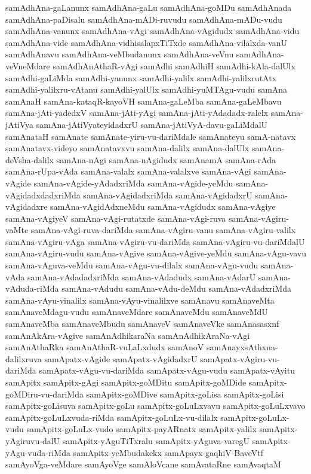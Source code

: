 {samAdhAna-gaLanunx
samAdhAna-gaLu
samAdhAna-goMDu
samAdhAnada
samAdhAna-paDisalu
samAdhAna-mADi-ruvudu
samAdhAna-mADu-vudu
samAdhAna-vanunx
samAdhAna-vAgi
samAdhAna-vAgidudx
samAdhAna-vidu
samAdhAna-vide
samAdhAna-vidhisalapxTiTxde
samAdhAna-vilalxda-vanU
samAdhAnavu
samAdhAna-veMbudanunx
samAdhAna-veVnu
samAdhAna-veVneMdare
samAdhAnAthaR-vAgi
samAdhi
samAdhiH
samAdhi-kAla-dalUlx
samAdhi-gaLiMda
samAdhi-yanunx
samAdhi-yalilx
samAdhi-yalilxrutAtx
samAdhi-yalilxru-vAtanu
samAdhi-yalUlx
samAdhi-yuMTAgu-vudu
samAna
samAnaH
samAna-kataqR-kayoVH
samAna-gaLeMba
samAna-gaLeMbavu
samAna-jAti-yadedxV
samAna-jAti-yAgi
samAna-jAti-yAdadadx-ralelx
samAna-jAtiVya
samAna-jAtiVyateyidadxrU
samAna-jAtiVyA-davu-gaLiMdalU
samAnataH
samAnate
samAnate-yiru-vu-dariMdale
samAnateyu
samA-natavx
samAnatavx-videyo
samAnatavxvu
samAna-dalilx
samAna-dalUlx
samAna-deVsha-dalilx
samAna-nAgi
samAna-nAgidudx
samAnamA
samAna-rAda
samAna-rUpa-vAda
samAna-valalx
samAna-valalxve
samAna-vAgi
samAna-vAgide
samAna-vAgide-yAdadxriMda
samAna-vAgide-yeMdu
samAna-vAgidadxdadxriMda
samAna-vAgidadxriMda
samAna-vAgidadxrU
samAna-vAgidadxre
samAna-vAgidAdxneMdu
samAna-vAgidudx
samAna-vAgiye
samAna-vAgiyeV
samAna-vAgi-rutatxde
samAna-vAgi-ruva
samAna-vAgiru-vaMte
samAna-vAgi-ruva-dariMda
samAna-vAgiru-vanu
samAna-vAgiru-valilx
samAna-vAgiru-vAga
samAna-vAgiru-vu-dariMda
samAna-vAgiru-vu-dariMdalU
samAna-vAgiru-vudu
samAna-vAgive
samAna-vAgive-yeMdu
samAna-vAgu-vavu
samAna-vAguva-veMdu
samAna-vAgu-vu-dilalx
samAna-vAgu-vudu
samAna-vAda
samAna-vAdadadxriMda
samAna-vAdadudx
samAna-vAdarU
samAna-vAduda-riMda
samAna-vAdudu
samAna-vAdu-deMdu
samAna-vAdadxriMda
samAna-vAyu-vinalilx
samAna-vAyu-vinalilxve
samAnavu
samAnaveMta
samAnaveMdagu-vudu
samAnaveMdare
samAnaveMdu
samAnaveMdU
samAnaveMba
samAnaveMbudu
samAnaveV
samAnaveVke
samAnasasxnf
samAnAkAra-vAgive
samAnAdhikaraNa
samAnAdhikAraNa-vAgi
samAnAthaRka
samAnAthaR-vuLaLxdudx
samAnoV
samAnayxsAthxna-dalilxruva
samApatx-vAgide
samApatx-vAgidadxrU
samApatx-vAgiru-vu-dariMda
samApatx-vAgu-vu-dariMda
samApatx-vAgu-vudu
samApatx-vAyitu
samApitx
samApitx-gAgi
samApitx-goMDitu
samApitx-goMDide
samApitx-goMDiru-vu-dariMda
samApitx-goMDive
samApitx-goLisa
samApitx-goLisi
samApitx-goLisuva
samApitx-goLu
samApitx-goLuLxvavu
samApitx-goLuLxvavo
samApitx-goLuLxvuda-riMda
samApitx-goLuLx-vu-dilalx
samApitx-goLuLx-vudu
samApitx-goLuLx-vudo
samApitx-payARnatx
samApitx-yalilx
samApitx-yAgiruvu-dalU
samApitx-yAguTiTxralu
samApitx-yAguva-varegU
samApitx-yAgu-vuda-riMda
samApitx-yeMbudakekx
samApayx-gaqhiV-BaveVtf
samAyoVga-veMdare
samAyoVge
samAloVcane
samAvataRne
samAvaqtaM
}
